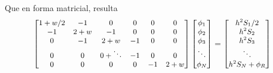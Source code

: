 \begin{frame}
Que en forma matricial, resulta
\fontsize{10}{10}\selectfont
\[ \small{\begin{bmatrix}
1+w/2 & -1 & 0 & 0 & 0 & 0 \\
-1 & 2+w & -1 & 0 & 0 & 0 \\
0 & -1 & 2+w & -1 & 0 & 0 \\
0 & 0 & 0 + \ddots & -1 & 0 & 0 \\
0 & 0 & 0 & 0 & -1 & 2+w
\end{bmatrix} 
\begin{bmatrix}
\phi_{1} \\
\phi_{2} \\
\phi_{3} \\
\ddots \\
\phi_{N} \\
\end{bmatrix} =
\begin{bmatrix}
h^{2}S_{1}/2 \\
h^{2}S_{2} \\
h^{2}S_{3} \\
\ddots \\
h^{2}S_{N}+\phi_{R} \\
\end{bmatrix}}
\]
\end{frame}

